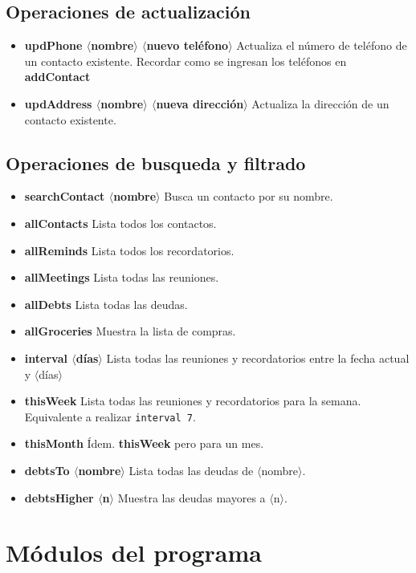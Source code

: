 \documentclass[a4paper,12pt]{article}
\begin{document}
    \subsection*{Operaciones de actualización}
    \begin{itemize}
      \item \textbf{updPhone $\langle$nombre$\rangle$ $\langle$nuevo teléfono$\rangle$} Actualiza el número de teléfono de un contacto existente. Recordar como se ingresan los teléfonos en \textbf{addContact}

      \item \textbf{updAddress $\langle$nombre$\rangle$ $\langle$nueva dirección$\rangle$} Actualiza la dirección de un contacto existente.
    \end{itemize}

    \subsection*{Operaciones de busqueda y filtrado}
    \begin{itemize}
      \item \textbf{searchContact $\langle$nombre$\rangle$} Busca un contacto por su nombre.
      \item \textbf{allContacts} Lista todos los contactos.
      \item \textbf{allReminds} Lista todos los recordatorios.
      \item \textbf{allMeetings} Lista todas las reuniones.
      \item \textbf{allDebts} Lista todas las deudas.
      \item \textbf{allGroceries} Muestra la lista de compras.
      \item \textbf{interval $\langle$días$\rangle$} Lista todas las reuniones y recordatorios entre la fecha actual y $\langle$días$\rangle$
      \item \textbf{thisWeek} Lista todas las reuniones y recordatorios para la semana. Equivalente a realizar \texttt{interval 7}.
      \item \textbf{thisMonth} Ídem. \textbf{thisWeek} pero para un mes.
      \item \textbf{debtsTo $\langle$nombre$\rangle$} Lista todas las deudas de $\langle$nombre$\rangle$.
      \item \textbf{debtsHigher $\langle$n$\rangle$} Muestra las deudas mayores a $\langle$n$\rangle$.
    \end{itemize}

    \section*{Módulos del programa}
\end{document}
